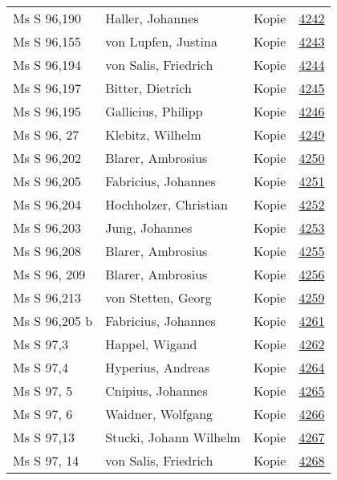 \documentclass[10pt,a4paper,landscape]{report}
\begin{document}
\begin{longtable}{p{16cm}p{4cm}lr}
Ms S 96,190	&	Haller, Johannes	&	Kopie	&	\href{http://130.60.24.72/assignment/4242}{4242}\\
Ms S 96,155	&	von Lupfen, Justina	&	Kopie	&	\href{http://130.60.24.72/assignment/4243}{4243}\\
Ms S 96,194	&	von Salis, Friedrich	&	Kopie	&	\href{http://130.60.24.72/assignment/4244}{4244}\\
Ms S 96,197	&	Bitter, Dietrich	&	Kopie	&	\href{http://130.60.24.72/assignment/4245}{4245}\\
Ms S 96,195	&	Gallicius, Philipp	&	Kopie	&	\href{http://130.60.24.72/assignment/4246}{4246}\\
Ms S  96, 27	&	Klebitz, Wilhelm	&	Kopie	&	\href{http://130.60.24.72/assignment/4249}{4249}\\
Ms S 96,202	&	Blarer, Ambrosius	&	Kopie	&	\href{http://130.60.24.72/assignment/4250}{4250}\\
Ms S 96,205	&	Fabricius, Johannes	&	Kopie	&	\href{http://130.60.24.72/assignment/4251}{4251}\\
Ms S 96,204	&	Hochholzer, Christian	&	Kopie	&	\href{http://130.60.24.72/assignment/4252}{4252}\\
Ms S 96,203	&	Jung, Johannes	&	Kopie	&	\href{http://130.60.24.72/assignment/4253}{4253}\\
Ms S 96,208	&	Blarer, Ambrosius	&	Kopie	&	\href{http://130.60.24.72/assignment/4255}{4255}\\
Ms S 96, 209	&	Blarer, Ambrosius	&	Kopie	&	\href{http://130.60.24.72/assignment/4256}{4256}\\
Ms S 96,213	&	von Stetten, Georg	&	Kopie	&	\href{http://130.60.24.72/assignment/4259}{4259}\\
Ms S 96,205 b	&	Fabricius, Johannes	&	Kopie	&	\href{http://130.60.24.72/assignment/4261}{4261}\\
Ms S 97,3	&	Happel, Wigand	&	Kopie	&	\href{http://130.60.24.72/assignment/4262}{4262}\\
Ms S 97,4	&	Hyperius, Andreas	&	Kopie	&	\href{http://130.60.24.72/assignment/4264}{4264}\\
Ms S 97, 5	&	Cnipius, Johannes	&	Kopie	&	\href{http://130.60.24.72/assignment/4265}{4265}\\
Ms S 97, 6	&	Waidner, Wolfgang	&	Kopie	&	\href{http://130.60.24.72/assignment/4266}{4266}\\
Ms S 97,13	&	Stucki, Johann Wilhelm	&	Kopie	&	\href{http://130.60.24.72/assignment/4267}{4267}\\
Ms S 97, 14	&	von Salis, Friedrich	&	Kopie	&	\href{http://130.60.24.72/assignment/4268}{4268}\\

\end{longtable}
\end{document}
